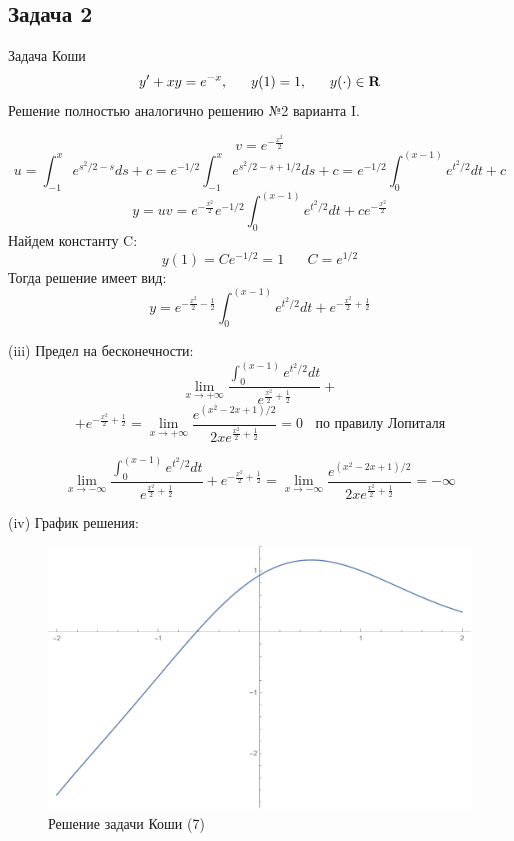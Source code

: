 \documentclass[a4paper, 12pt]{article}
\begin{document}
	\subsection {Задача 2}

Задача Коши 
\begin{equation}
	y'+xy=e^{-x},\;\;\;\;\;\;y(1) = 1, \;\;\;\;\;\;y(\cdot) \in \bf{R}
\end{equation}
Решение полностью аналогично решению №2 варианта I.


\[v= e^{-\frac{x^2} 2}\]
\[u=\int_{-1}^x e^{s^2/2-s} ds+ c= e^{-1/2} \int_{-1}^{x} e^{s^2/2-s+1/2} ds+c = e^{-1/2}\int_0^{(x-1)} e^{t^2/2} dt+c\]
\[y = uv = e^{-\frac{x^2} 2}  e^{-1/2}\int_{0}^{(x-1)} e^{t^2/2} dt+ce^{-\frac{x^2} 2}\] 
Найдем константу C:
\[y(1)=Ce^{-1/2}=1\;\;\;\;\;\; C = e^{1/2}\]
Тогда решение имеет вид:
\[y =e^{-\frac{x^2} 2- \frac 1 2 } \int_{0}^{(x-1)} e^{t^2/2} dt+e^{-\frac{x^2} 2 +\frac 1 2 }\] 

(iii) Предел на бесконечности:
\[ \lim_{x\rightarrow +\infty} \frac  {\int_{0}^{(x-1)} e^{t^2/2} dt} {e^{\frac{x^2} 2 + \frac 1 2 }}+\]
\[+e^{-\frac{x^2} 2 +\frac 1 2 }=  \lim_{x\rightarrow +\infty} \frac  {e^{(x^2-2x+1)/ 2}} {2x e^{\frac{x^2} 2 + \frac 1 2 }} = 0 \;\;\text{ по правилу Лопиталя}\]

\[\lim_{x\rightarrow -\infty} \frac  {\int_{0}^{(x-1)} e^{t^2/2} dt} {e^{\frac{x^2} 2 + \frac 1 2 }}+e^{-\frac{x^2} 2 +\frac 1 2 }= \lim_{x\rightarrow -\infty} \frac  {e^{(x^2-2x+1)/ 2}} {2x e^{\frac{x^2} 2 + \frac 1 2 }} = -\infty\]

(iv) График решения:\\




\begin{figure}[H]
	\centering
	\includegraphics[scale=0.7]{16}
	\caption{Решение задачи Коши (7)}
\end{figure}
\end{document}
